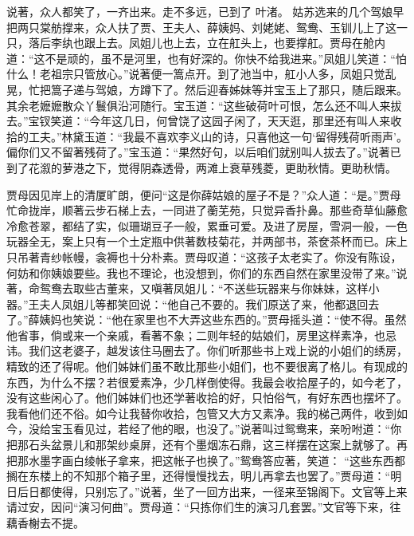 \begin{parag}
    说著，众人都笑了，一齐出来。走不多远，已到了 叶渚。 姑苏选来的几个驾娘早把两只棠舫撑来，众人扶了贾、王夫人、薛姨妈、刘姥姥、鸳鸯、玉钏儿上了这一只，落后李纨也跟上去。凤姐儿也上去，立在舡头上，也要撑舡。贾母在舱内道：“这不是顽的，虽不是河里，也有好深的。你快不给我进来。”凤姐儿笑道：“怕什么！老祖宗只管放心。”说著便一篙点开。到了池当中，舡小人多，凤姐只觉乱晃，忙把篙子递与驾娘，方蹲下了。然后迎春姊妹等并宝玉上了那只，随后跟来。其余老嬷嬷散众丫鬟俱沿河随行。宝玉道：“这些破荷叶可恨，怎么还不叫人来拔去。”宝钗笑道：“今年这几日，何曾饶了这园子闲了，天天逛，那里还有叫人来收拾的工夫。”林黛玉道：“我最不喜欢李义山的诗，只喜他这一句‘留得残荷听雨声’。偏你们又不留著残荷了。”宝玉道：“果然好句，以后咱们就别叫人拔去了。”说著已到了花溆的萝港之下，觉得阴森透骨，两滩上衰草残菱，更助秋情。更助秋情。
\end{parag}


\begin{parag}
    贾母因见岸上的清厦旷朗，便问“这是你薛姑娘的屋子不是？”众人道：“是。”贾母忙命拢岸，顺著云步石梯上去，一同进了蘅芜苑，只觉异香扑鼻。那些奇草仙藤愈冷愈苍翠，都结了实，似珊瑚豆子一般，累垂可爱。及进了房屋，雪洞一般，一色玩器全无，案上只有一个土定瓶中供著数枝菊花，并两部书，茶奁茶杯而已。床上只吊著青纱帐幔，衾褥也十分朴素。贾母叹道：“这孩子太老实了。你没有陈设，何妨和你姨娘要些。我也不理论，也没想到，你们的东西自然在家里没带了来。”说著，命鸳鸯去取些古董来，又嗔著凤姐儿：“不送些玩器来与你妹妹，这样小器。”王夫人凤姐儿等都笑回说：“他自己不要的。我们原送了来，他都退回去了。”薛姨妈也笑说：“他在家里也不大弄这些东西的。”贾母摇头道：“使不得。虽然他省事，倘或来一个亲戚，看著不象；二则年轻的姑娘们，房里这样素净，也忌讳。我们这老婆子，越发该住马圈去了。你们听那些书上戏上说的小姐们的绣房，精致的还了得呢。他们姊妹们虽不敢比那些小姐们，也不要很离了格儿。有现成的东西，为什么不摆？若很爱素净，少几样倒使得。我最会收拾屋子的，如今老了，没有这些闲心了。他们姊妹们也还学著收拾的好，只怕俗气，有好东西也摆坏了。我看他们还不俗。如今让我替你收拾，包管又大方又素净。我的梯己两件，收到如今，没给宝玉看见过，若经了他的眼，也没了。”说著叫过鸳鸯来，亲吩咐道：“你把那石头盆景儿和那架纱桌屏，还有个墨烟冻石鼎，这三样摆在这案上就够了。再把那水墨字画白绫帐子拿来，把这帐子也换了。”鸳鸯答应著，笑道： “这些东西都搁在东楼上的不知那个箱子里，还得慢慢找去，明儿再拿去也罢了。”贾母道：“明日后日都使得，只别忘了。”说著，坐了一回方出来，一径来至锦阁下。文官等上来请过安，因问“演习何曲”。贾母道：“只拣你们生的演习几套罢。”文官等下来，往藕香榭去不提。
\end{parag}


